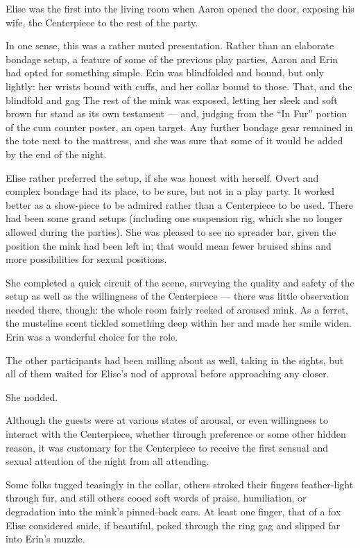 Elise was the first into the living room when Aaron opened the door, exposing his wife, the Centerpiece to the rest of the party.

In one sense, this was a rather muted presentation. Rather than an elaborate bondage setup, a feature of some of the previous play parties, Aaron and Erin had opted for something simple. Erin was blindfolded and bound, but only lightly: her wrists bound with cuffs, and her collar bound to those. That, and the blindfold and gag The rest of the mink was exposed, letting her sleek and soft brown fur stand as its own testament --- and, judging from the ``In Fur'' portion of the cum counter poster, an open target. Any further bondage gear remained in the tote next to the mattress, and she was sure that some of it would be added by the end of the night.

Elise rather preferred the setup, if she was honest with herself. Overt and complex bondage had its place, to be sure, but not in a play party. It worked better as a show-piece to be admired rather than a Centerpiece to be used. There had been some grand setups (including one suspension rig, which she no longer allowed during the parties). She was pleased to see no spreader bar, given the position the mink had been left in; that would mean fewer bruised shins and more possibilities for sexual positions.

She completed a quick circuit of the scene, surveying the quality and safety of the setup as well as the willingness of the Centerpiece --- there was little observation needed there, though: the whole room fairly reeked of aroused mink. As a ferret, the musteline scent tickled something deep within her and made her smile widen. Erin was a wonderful choice for the role.

The other participants had been milling about as well, taking in the sights, but all of them waited for Elise's nod of approval before approaching any closer.

She nodded.

Although the guests were at various states of arousal, or even willingness to interact with the Centerpiece, whether through preference or some other hidden reason, it was customary for the Centerpiece to receive the first sensual and sexual attention of the night from all attending.

Some folks tugged teasingly in the collar, others stroked their fingers feather-light through fur, and still others cooed soft words of praise, humiliation, or degradation into the mink's pinned-back ears. At least one finger, that of a fox Elise considered snide, if beautiful, poked through the ring gag and slipped far into Erin's muzzle.

